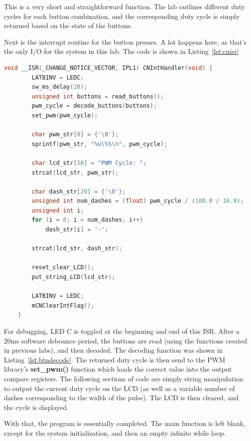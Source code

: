 \documentclass[a4paper, 12pt]{article}
\begin{document}
This is a very short and straightforward function. The lab outlines different duty cycles for each button combination, and the corresponding duty cycle is simply returned based on the state of the buttons.

Next is the interrupt routine for the button presses. A lot happens here, as that's the only I/O for the system in this lab. The code is shown in Listing~\ref{lst:cnisr}

\begin{mdframed}[backgroundcolor=code-gray, roundcorner=10pt,
								innerleftmargin=5, innertopmargin=5, innerbottommargin=5]	
	\begin{lstlisting}[language=C, caption=Change Notice ISR, tabsize=2, label={lst:cnisr}]
	void __ISR(_CHANGE_NOTICE_VECTOR, IPL1) CNIntHandler(void) {
		LATBINV = LEDC;
		sw_ms_delay(20);
		unsigned int buttons = read_buttons();
		pwm_cycle = decode_buttons(buttons);
		set_pwm(pwm_cycle);

		char pwm_str[8] = {'\0'};
		sprintf(pwm_str, "%u\%%\n", pwm_cycle);
	
		char lcd_str[50] = "PWM Cycle: ";
		strcat(lcd_str, pwm_str);

		char dash_str[20] = {'\0'};
		unsigned int num_dashes = (float) pwm_cycle / (100.0 / 16.0);
		unsigned int i;
		for (i = 0; i < num_dashes; i++)
			dash_str[i] = '-';

		strcat(lcd_str, dash_str);

		reset_clear_LCD();
		put_string_LCD(lcd_str);

		LATBINV = LEDC;
		mCNClearIntFlag();
	}
	\end{lstlisting}
	\end{mdframed}
	
For debugging, LED C is toggled at the beginning and end of this ISR. After a 20ms software debounce period, the buttons are read (using the functions created in previous labs), and then decoded. The decoding function was shown in Listing~\ref{lst:btndecode}. The returned duty cycle is then send to the PWM library's \textbf{set\_pwm()} function which loads the correct value into the output compare registers. The following sections of code are simply string manipulation to output the current duty cycle on the LCD (as well as a variable number of dashes corresponding to the width of the pulse). The LCD is then cleared, and the cycle is displayed.

With that, the program is essentially completed. The main function is left blank, except for the system initialization, and then an empty infinite while loop.
\end{document}

